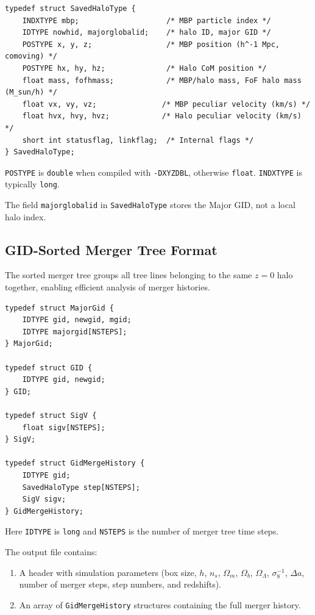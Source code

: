 \documentclass[11pt,fleqn]{book}
\newcommand{\code}[1]{\texttt{#1}}
\newcommand{\flag}[1]{\texttt{-D#1}}
\begin{document}
\begin{definition}[SavedHaloType]
\begin{lstlisting}[style=ccode,numbers=none]
typedef struct SavedHaloType {
    INDXTYPE mbp;                    /* MBP particle index */
    IDTYPE nowhid, majorglobalid;    /* halo ID, major GID */
    POSTYPE x, y, z;                 /* MBP position (h^-1 Mpc, comoving) */
    POSTYPE hx, hy, hz;              /* Halo CoM position */
    float mass, fofhmass;            /* MBP/halo mass, FoF halo mass (M_sun/h) */
    float vx, vy, vz;               /* MBP peculiar velocity (km/s) */
    float hvx, hvy, hvz;            /* Halo peculiar velocity (km/s) */
    short int statusflag, linkflag;  /* Internal flags */
} SavedHaloType;
\end{lstlisting}
\code{POSTYPE} is \code{double} when compiled with \flag{XYZDBL}, otherwise \code{float}.  \code{INDXTYPE} is typically \code{long}.
\end{definition}

\begin{important}
The field \code{majorglobalid} in \code{SavedHaloType} stores the Major GID, not a local halo index.
\end{important}

\subsection{GID-Sorted Merger Tree Format}

The sorted merger tree groups all tree lines belonging to the same $z=0$ halo together, enabling efficient analysis of merger histories.

\begin{definition}
\begin{lstlisting}[style=ccode,numbers=none]
typedef struct MajorGid {
    IDTYPE gid, newgid, mgid;
    IDTYPE majorgid[NSTEPS];
} MajorGid;

typedef struct GID {
    IDTYPE gid, newgid;
} GID;

typedef struct SigV {
    float sigv[NSTEPS];
} SigV;

typedef struct GidMergeHistory {
    IDTYPE gid;
    SavedHaloType step[NSTEPS];
    SigV sigv;
} GidMergeHistory;
\end{lstlisting}
Here \code{IDTYPE} is \code{long} and \code{NSTEPS} is the number of merger tree time steps.
\end{definition}

The output file contains:
\begin{enumerate}[leftmargin=2em]
  \item A header with simulation parameters (box size, $h$, $n_s$, $\Omega_m$, $\Omega_b$, $\Omega_\Lambda$, $\sigma_8^{-1}$, $\Delta a$, number of merger steps, step numbers, and redshifts).
  \item An array of \code{GidMergeHistory} structures containing the full merger history.
\end{enumerate}
\end{document}
